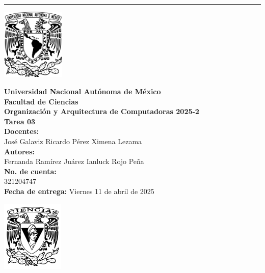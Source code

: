 \documentclass[12pt,letterpaper]{article}
\begin{document}
\bigskip
\hrule height 0.1pt
\bigskip

\begin{center}
  \begin{minipage}{3cm}
    \begin{center}
      \includegraphics[height=3.4cm]{../unam_logo.png}
    \end{center}
  \end{minipage}\hfill
  \begin{minipage}{10cm}
    \begin{center}
      \textbf{\Large Universidad Nacional Autónoma de México}\\[0.2cm]
      \textbf{\large Facultad de Ciencias}\\[0.2cm]
      \textbf{Organización y Arquitectura de Computadoras 2025-2}\\[0.4cm]
      \textbf{\Large Tarea 03}\\[0.1cm]
      \textbf{Docentes:}\\
      José Galaviz \hspace{1em} Ricardo Pérez \hspace{1em} Ximena Lezama\\[0.3cm]
      \textbf{Autores:}\\
      Fernanda Ramírez Juárez \quad Ianluck Rojo Peña\\[0.2cm]
      \textbf{No. de cuenta:}\\
      321204747 \\[0.2cm]
      \textbf{Fecha de entrega:} Viernes 11 de abril de 2025
    \end{center}
  \end{minipage}\hfill
  \begin{minipage}{3cm}
    \begin{center}
      \includegraphics[height=3.4cm]{../fc_logo.png}
    \end{center}
  \end{minipage}
\end{center}
\end{document}
